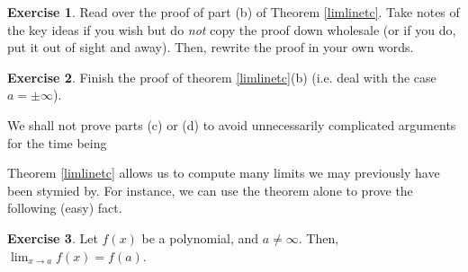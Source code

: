 \documentclass[english]{book}
\theoremstyle{remark}
\theoremstyle{definition}
\newtheorem{excs}{Exercise}[chapter]
\newtheorem*{next week}{Next Week}
\newcommand{\dlim}{\displaystyle\lim}
\begin{document}
\begin{excs}
Read over the proof of part (b) of Theorem \ref{limlinetc}. Take notes of the key ideas if you wish but do \emph{not} copy the proof down wholesale (or if you do, put it out of sight and away). Then, rewrite the proof in your own words.
\end{excs}
\begin{excs}
Finish the proof of theorem \ref{limlinetc}(b) (i.e. deal with the case $a=\pm \infty$).
\end{excs}
We shall not prove parts (c) or (d) to avoid unnecessarily complicated arguments for the time being\textellipsis

Theorem \ref{limlinetc} allows us to compute many limits we may previously have been stymied by. For instance, we can use the theorem alone to prove the following (easy) fact.
\begin{excs}\label{polycont}
	Let $f(x)$ be a polynomial, and $a\neq \infty$. Then, $\dlim_{x\to a} f(x)=f(a)$.
\end{excs}
\end{document}
